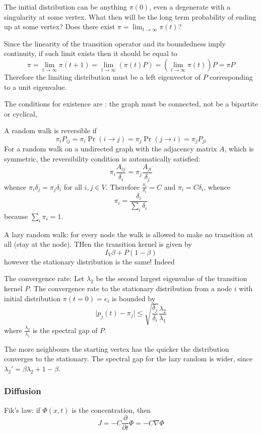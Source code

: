 \documentclass[a4paper]{article}
\begin{document}
The initial distribution can be anything $\pi(0)$, even a degenerate with a
singularity at some vertex. What then will be the long term probability of
ending up at some vertex? Does there exist $\pi = \lim_{t\to \infty}\pi(t)$?

Since the linearity of the transition operator and its boundedness imply continuity, if such limit exists then it should be equal to
\[
\pi
= \lim_{t\to\infty}\pi(t+1)
= \lim_{t\to\infty}(\pi(t)P)
= (\lim_{t\to\infty}\pi(t)) P
= \pi P
\]
Therefore the limiting distribution must be a left eigenvector of $P$
corresponding to a unit eigenvalue.

The conditions for existence are : the graph must be connected, not be a bipartite or cyclical, 

A random walk is reversible if
\[
\pi_i P_{ij} 
= \pi_i \Pr(i\to j)
= \pi_j \Pr(j\to i)
= \pi_j P_{ji}
\]
For a random walk on a undirected graph with the adjacency matrix $A$, which is symmetric, the reversibility condition is automatically satisfied:
\[\pi_i \frac{A_{ij}}{\delta_i} = \pi_j \frac{A_{ji}}{\delta_j}\]
whence $\pi_i\delta_j = \pi_j \delta_i$ for all $i,j\in V$.
Therefore $\frac{\pi_i}{\delta_i} = C$ and $\pi_i = C\delta_i$, whence
\[\pi_i = \frac{\delta_i}{\sum_i \delta_i}\]
because $\sum_i \pi_i = 1$.

A lazy random walk: for every node the walk is allowed to make no transition at all (stay at the node). THen the transition kernel is given by
\[I_V \beta + P (1-\beta) \]
however the stationary distribution is the same! Indeed
\[\]

The convergence rate: Let $\lambda_2$ be the second largest eigenvalue of the 
transition kernel $P$. The convergence rate to the stationary distribution from a node $i$ with initial distribution $\pi(t=0) = e_i$ is bounded by
\[\lvert p_j(t) - \pi_j \rvert \leq \sqrt{\frac{\delta_j}{\delta_i}} \frac{\lambda_2}{\lambda_1}\]
where $\frac{\lambda_2}{\lambda_1}$ is the spectral gap of $P$.

The more neighbours the starting vertex has the quicker the distribution
converges to the stationary. The spectral gap for the lazy random is wider,
since $\lambda_2' = \beta \lambda_2 + 1-\beta$.

\subsubsection{Diffusion} %
\label{ssub:diffusion}

Fik's law: if $\Phi(x,t)$ is the concentration, then
\[
J
= - C\frac{\partial}{\partial t}\Phi
= - C \nabla\Phi
\]
\end{document}
